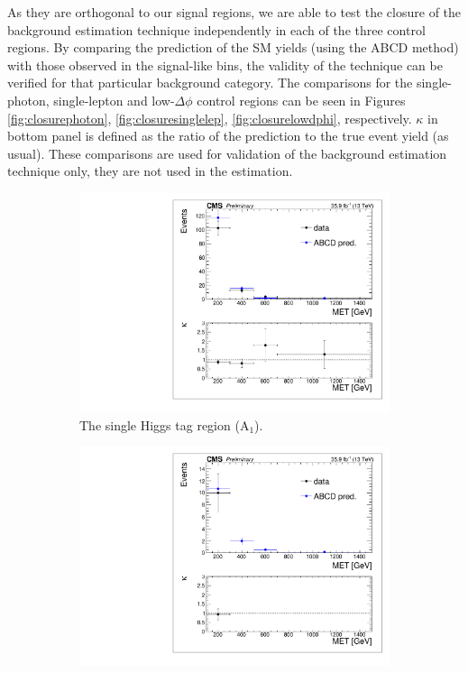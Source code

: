 As they are orthogonal to our signal regions, we are able to test the closure of the background estimation technique independently in each of the three control regions. By comparing the prediction of the SM yields (using the ABCD method) with those observed in the signal-like bins, the validity of the technique can be verified for that particular background category. The comparisons for the single-photon, single-lepton and low-$\Delta\phi$ control regions can be seen in Figures \ref{fig:closurephoton}, \ref{fig:closuresinglelep}, \ref{fig:closurelowdphi}, respectively. $\kappa$ in bottom panel is defined as the ratio of the prediction to the true event yield (as usual). These comparisons are used for validation of the background estimation technique only, they are not used in the estimation.

\begin{figure}
\begin{subfigure}[b]{0.5\textwidth}
\centering
\includegraphics[trim={5px 5px 5px 5px},clip,width=\textwidth]{figs/SUS17006/dataClosure_single-tagSR_photon.pdf}
\caption{The single Higgs tag region (A$_{1}$).}
\end{subfigure}
\begin{subfigure}[b]{0.5\textwidth}
\centering
\includegraphics[trim={5px 5px 5px 5px},clip,width=\textwidth]{figs/SUS17006/dataClosure_double-tagSR_photon.pdf} 

\end{subfigure}
\end{figure}
